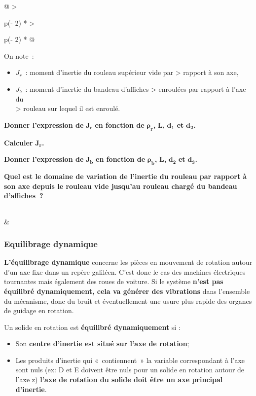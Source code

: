 \begin{longtable}[]{@{}
  >{\raggedright\arraybackslash}p{(\columnwidth - 2\tabcolsep) * }
  >{\raggedright\arraybackslash}p{(\columnwidth - 2\tabcolsep) * }@{}}
\begin{minipage}[b]{\linewidth}
On note~:

\begin{itemize}
\item
  \(J_{r}\)~: moment d'inertie du rouleau supérieur vide par \textgreater{} rapport à son axe,
\item
  \(J_{b}\)~: moment d'inertie du bandeau d'affiches \textgreater{} enroulées par rapport à l'axe du\\
  \textgreater{} rouleau sur lequel il est enroulé.
\end{itemize}

\textbf{Donner l'expression de} \(\mathbf{J}_{\mathbf{r}}\) \textbf{en fonction de} \(\mathbf{\rho}_{\mathbf{r}}\)\textbf{,} \(\mathbf{L}\)\textbf{,} \(\mathbf{d}_{\mathbf{1}}\) \textbf{et} \(\mathbf{d}_{\mathbf{2}}\)\textbf{.}

\textbf{Calculer} \(\mathbf{J}_{\mathbf{r}}\)\textbf{.}

\textbf{Donner l'expression de} \(\mathbf{J}_{\mathbf{b}}\) \textbf{en fonction de} \(\mathbf{\rho}_{\mathbf{b}}\)\textbf{,} \(\mathbf{L}\)\textbf{,} \(\mathbf{d}_{\mathbf{2}}\) \textbf{et} \(\mathbf{d}_{\mathbf{3}}\)\textbf{.}

\textbf{Quel est le domaine de variation de l'inertie du rouleau par rapport à son axe depuis le rouleau vide jusqu'au rouleau chargé du bandeau d'affiches~?}\strut
\end{minipage} \\
\midrule\noalign{}
\endhead
\bottomrule\noalign{}
\endlastfoot
& \\
\end{longtable}

\hypertarget{equilibrage-dynamique}{%
\subsubsection{Equilibrage dynamique}\label{equilibrage-dynamique}}

\textbf{L'équilibrage dynamique} concerne les pièces en mouvement de rotation autour d'un axe fixe dans un repère galiléen. C'est donc le cas des machines électriques tournantes mais également des roues de voiture. Si le système \textbf{n'est pas équilibré dynamiquement, cela va générer des vibrations} dans l'ensemble du mécanisme, donc du bruit et éventuellement une usure plus rapide des organes de guidage en rotation.

Un solide en rotation est \textbf{équilibré dynamiquement} si :

\begin{itemize}
\item
  Son \textbf{centre d'inertie est situé sur l'axe de rotation};
\item
  Les produits d'inertie qui «~contiennent~» la variable correspondant à l'axe sont nuls (ex: D et E doivent être nuls pour un solide en rotation autour de l'axe z) \textbf{l'axe de rotation du solide doit être un axe principal d'inertie}.
\end{itemize}

